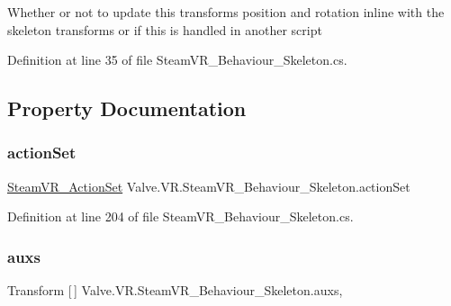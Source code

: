 Whether or not to update this transform\textquotesingle{}s position and rotation inline with the skeleton transforms or if this is handled in another script 



Definition at line 35 of file Steam\+V\+R\+\_\+\+Behaviour\+\_\+\+Skeleton.\+cs.



\subsection{Property Documentation}
\mbox{\label{class_valve_1_1_v_r_1_1_steam_v_r___behaviour___skeleton_a5f4dba4ffc2453fbc3d7bb5274f3dc0d}} 
\subsubsection{\texorpdfstring{actionSet}{actionSet}}
{\footnotesize\ttfamily \mbox{\hyperlink{class_valve_1_1_v_r_1_1_steam_v_r___action_set}{Steam\+V\+R\+\_\+\+Action\+Set}} Valve.\+V\+R.\+Steam\+V\+R\+\_\+\+Behaviour\+\_\+\+Skeleton.\+action\+Set\hspace{0.3cm}{\ttfamily [get]}}



Definition at line 204 of file Steam\+V\+R\+\_\+\+Behaviour\+\_\+\+Skeleton.\+cs.

\mbox{\label{class_valve_1_1_v_r_1_1_steam_v_r___behaviour___skeleton_a2807dfb58c0dddf3ff09e1be1f206a1c}} 
\subsubsection{\texorpdfstring{auxs}{auxs}}
{\footnotesize\ttfamily Transform \mbox{[}$\,$\mbox{]} Valve.\+V\+R.\+Steam\+V\+R\+\_\+\+Behaviour\+\_\+\+Skeleton.\+auxs\hspace{0.3cm}{\ttfamily [get]}, {}}



